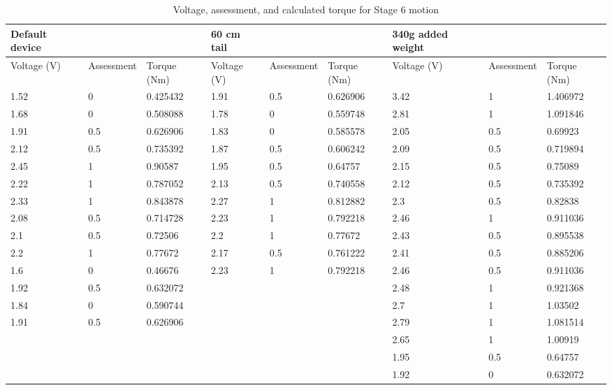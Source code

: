 \begin{landscape}
\begin{table}[!ht]
	\centering
	\caption{Voltage, assessment, and calculated torque for Stage 6 motion}
	\footnotesize
	\begin{tabular}{|l|l|l|l|l|l|l|l|l|}
		\hline
		Default device & ~ & ~ & 60 cm tail & ~ & ~ & 340g added weight & ~ & ~ \\ \hline
		Voltage (V) & Assessment & Torque (Nm) & Voltage (V) & Assessment & Torque (Nm) & Voltage (V) & Assessment & Torque (Nm) \\ \hline
		1.52 & 0 & 0.425432 & 1.91 & 0.5 & 0.626906 & 3.42 & 1 & 1.406972 \\ \hline
		1.68 & 0 & 0.508088 & 1.78 & 0 & 0.559748 & 2.81 & 1 & 1.091846 \\ \hline
		1.91 & 0.5 & 0.626906 & 1.83 & 0 & 0.585578 & 2.05 & 0.5 & 0.69923 \\ \hline
		2.12 & 0.5 & 0.735392 & 1.87 & 0.5 & 0.606242 & 2.09 & 0.5 & 0.719894 \\ \hline
		2.45 & 1 & 0.90587 & 1.95 & 0.5 & 0.64757 & 2.15 & 0.5 & 0.75089 \\ \hline
		2.22 & 1 & 0.787052 & 2.13 & 0.5 & 0.740558 & 2.12 & 0.5 & 0.735392 \\ \hline
		2.33 & 1 & 0.843878 & 2.27 & 1 & 0.812882 & 2.3 & 0.5 & 0.82838 \\ \hline
		2.08 & 0.5 & 0.714728 & 2.23 & 1 & 0.792218 & 2.46 & 1 & 0.911036 \\ \hline
		2.1 & 0.5 & 0.72506 & 2.2 & 1 & 0.77672 & 2.43 & 0.5 & 0.895538 \\ \hline
		2.2 & 1 & 0.77672 & 2.17 & 0.5 & 0.761222 & 2.41 & 0.5 & 0.885206 \\ \hline
		1.6 & 0 & 0.46676 & 2.23 & 1 & 0.792218 & 2.46 & 0.5 & 0.911036 \\ \hline
		1.92 & 0.5 & 0.632072 & ~ & ~ & ~ & 2.48 & 1 & 0.921368 \\ \hline
		1.84 & 0 & 0.590744 & ~ & ~ & ~ & 2.7 & 1 & 1.03502 \\ \hline
		1.91 & 0.5 & 0.626906 & ~ & ~ & ~ & 2.79 & 1 & 1.081514 \\ \hline
		~ & ~ & ~ & ~ & ~ & ~ & 2.65 & 1 & 1.00919 \\ \hline
		~ & ~ & ~ & ~ & ~ & ~ & 1.95 & 0.5 & 0.64757 \\ \hline
		~ & ~ & ~ & ~ & ~ & ~ & 1.92 & 0 & 0.632072 \\ \hline
	\end{tabular}
\end{table}

\end{landscape}